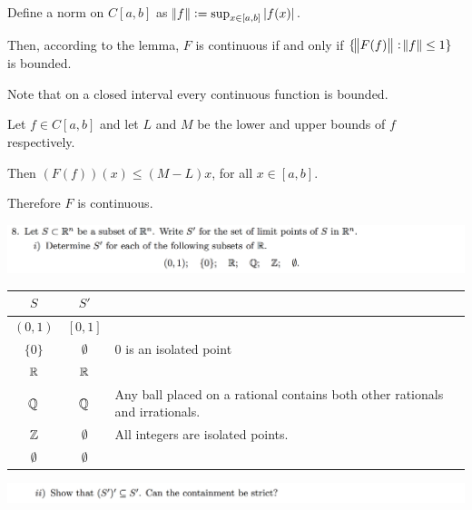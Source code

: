 \documentclass[12pt]{article}
\begin{document}
\begin{enumerate}[label=\roman*)]
  Define a norm on $C[a,b]$ as $\norm{f} := \sup_{x\in [a,b]}|f(x)|$.

  Then, according to the lemma, $F$ is continuous if and only if
  $\{\norm{F(f)} : \norm{f} \leq 1 \}$ is bounded.

  Note that on a closed interval every continuous function is bounded.

  Let $f \in C[a,b]$ and let $L$ and $M$ be the lower and upper bounds of $f$ respectively.

  Then $(F(f))(x) \leq (M-L)x$, for all $x \in [a,b]$.

  Therefore $F$ is continuous.

\end{enumerate}

\newpage
\begin{mdframed}
\includegraphics[width=400pt]{img/oxford-a2-1-8-1.png}
\end{mdframed}

\begin{table}[h!]
  \begin{tabular}{c|c|l}
    $S$         &$S'$         &                \\
    \hline
    $(0, 1)$    & $[0, 1]$    &                \\
    $\{0\}$     & $\emptyset$ & 0 is an isolated point \\
    $\mathbb{R}$        & $\mathbb{R}$        &                \\
    $\mathbb{Q}$        & $\mathbb{Q}$        & Any ball placed on a rational contains both other rationals and irrationals.\\
    $\mathbb{Z}$        & $\emptyset$ & All integers are isolated points.               \\
    $\emptyset$ & $\emptyset$ &
  \end{tabular}
\end{table}

\begin{mdframed}
\includegraphics[width=400pt]{img/oxford-a2-1-8-2.png}
\end{mdframed}

\end{document}
